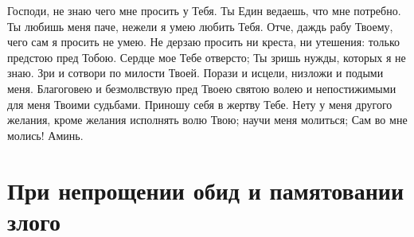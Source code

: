 Господи, не знаю чего мне просить у Тебя. Ты Един ведаешь, что мне потребно. Ты любишь меня паче, нежели я умею любить Тебя. Отче, даждь рабу Твоему, чего сам я просить не умею. Не дерзаю просить ни креста, ни утешения: только предстою пред Тобою. Сердце мое Тебе отверсто; Ты зришь нужды, которых я не знаю. Зри и сотвори по милости Твоей. Порази и исцели, низложи и подыми меня. Благоговею и безмолвствую пред Твоею святою волею и непостижимыми для меня Твоими судьбами. Приношу себя в жертву Тебе. Нету у меня другого желания, кроме желания исполнять волю Твою; научи меня молиться; Сам во мне молись! Аминь.  


\section{При непрощении обид и памятовании злого}
 


